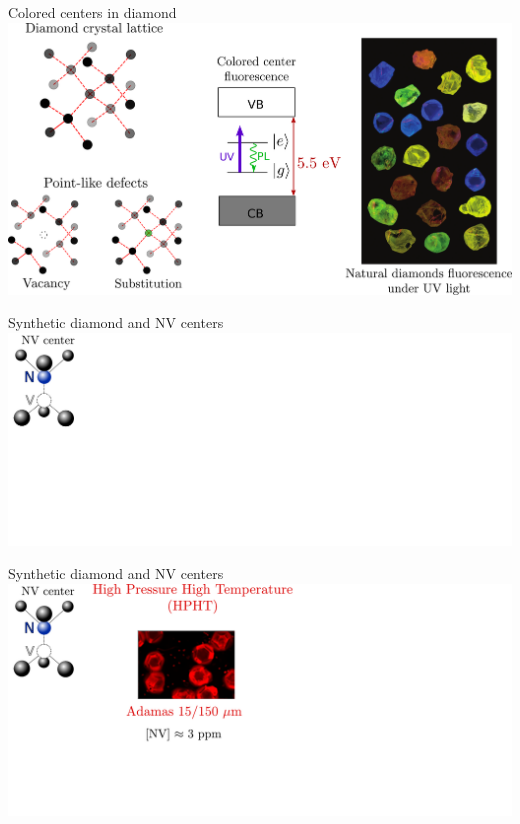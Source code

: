 \documentclass{beamer}
\begin{document}
\begin{frame}{Colored centers in diamond}
\centering
\includegraphics[width=\textwidth,height=0.85\textheight,keepaspectratio]{Slide diamant}
\end{frame}

\begin{frame}{Synthetic diamond and NV centers}
\centering
\includegraphics[width=\textwidth,height=0.85\textheight,keepaspectratio]{Slide_fab_sample-3}
\end{frame}

\begin{frame}{Synthetic diamond and NV centers}
\centering
\includegraphics[width=\textwidth,height=0.85\textheight,keepaspectratio]{Slide_fab_sample-2}
\end{frame}
\end{document}
